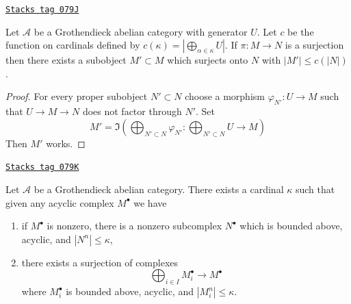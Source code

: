 \begin{lemma}
\label{injectives-lemma-surjection-bounded-size}
\href{https://stacks.math.columbia.edu/tag/079J}{\texttt{Stacks tag 079J}}

Let $\mathcal{A}$ be a Grothendieck abelian category with generator $U$.
Let $c$ be the function on cardinals defined by
$c(\kappa) = |\bigoplus_{\alpha \in \kappa} U|$. If $\pi : M \to N$ is a
surjection then there exists a subobject $M' \subset M$ which surjects
onto $N$ with $|M'| \leq c(|N|)$.
\end{lemma}

\begin{proof}
For every proper subobject $N' \subset N$ choose a morphism
$\varphi_{N'} : U \to M$ such that $U \to M \to N$ does not factor
through $N'$. Set
$$
M' = \Im\left(
\bigoplus\nolimits_{N' \subset N} \varphi_{N'} :
\bigoplus\nolimits_{N' \subset N} U \longrightarrow M\right)
$$
Then $M'$ works.
\end{proof}

\begin{lemma}
\label{injectives-lemma-acyclic-quotient-complexes-bounded-size}
\href{https://stacks.math.columbia.edu/tag/079K}{\texttt{Stacks tag 079K}}

Let $\mathcal{A}$ be a Grothendieck abelian category. There exists a cardinal
$\kappa$ such that given any acyclic complex $M^\bullet$ we have
\begin{enumerate}
\item if $M^\bullet$ is nonzero, there is a nonzero subcomplex
$N^\bullet$ which is bounded above, acyclic, and $|N^n| \leq \kappa$,
\item there exists a surjection of complexes
$$
\bigoplus\nolimits_{i \in I} M_i^\bullet \longrightarrow M^\bullet
$$
where $M_i^\bullet$ is bounded above, acyclic, and $|M_i^n| \leq \kappa$.
\end{enumerate}
\end{lemma}

